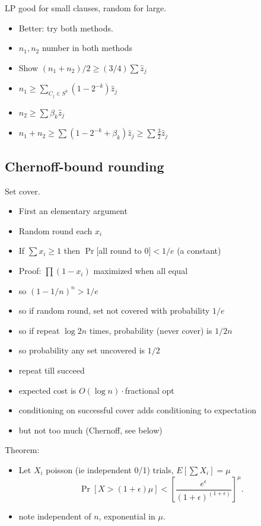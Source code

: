 \documentclass{article}
\def\zhat{{\hat z}}
\begin{document}
LP good for small clauses, random for large.
\begin{itemize}
\item  Better: try both methods.  
\item $n_1,n_2$ number in both methods
\item Show $(n_1+n_2)/2 \ge (3/4)\sum \zhat_j$
\item $n_1 \ge \sum_{C_j \in S^k} (1-2^{-k})\zhat_j$
\item $n_2 \ge \sum \beta_k \zhat_j$
\item $n_1+n_2 \ge \sum (1-2^{-k}+\beta_k) \zhat_j \ge \sum \frac32\zhat_j$
\end{itemize}

\iffalse

\subsection{Chernoff-bound rounding}

Set cover.
\begin{itemize}
\item First an elementary argument
\item Random round each $x_i$
\item If $\sum x_i \ge 1$ then $\Pr[$all round to 0$]<1/e$ (a constant)
\item Proof: $\prod(1-x_i)$ maximized when all equal
\item so $(1-1/n)^n>1/e$
\item so if random round,  set not covered with probability $1/e$
\item so if repeat $\log 2n$ times, probability (never cover) is $1/2n$
\item so probability any set uncovered is $1/2$
\item repeat till succeed
\item expected cost is $O(\log n)\cdot$fractional opt
\item conditioning on successful cover adds conditioning to
  expectation
\item but not too much (Chernoff, see below)
\end{itemize}



Theorem:
\begin{itemize}
\item Let $X_i$ poisson (ie independent 0/1) trials, $E[\sum
  X_i]=\mu$
  \[
  \Pr[X > (1+\epsilon) \mu ] < \left[
  \frac{e^\epsilon}{(1+\epsilon)^{(1+\epsilon)}}\right]^\mu.
  \]
\item note independent of $n$, exponential in $\mu$.
\end{itemize}
\end{document}
